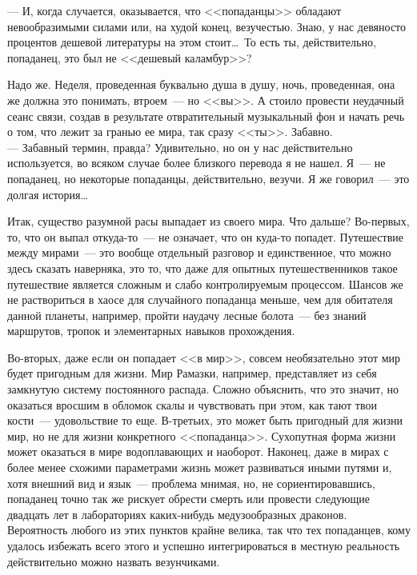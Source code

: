 \noindent --- И, когда случается, оказывается, что <<попаданцы>> обладают 
невообразимыми 
силами или, на худой конец, везучестью. Знаю, у нас девяносто процентов дешевой 
литературы на этом стоит\ldots\ То есть ты, действительно, попаданец, это был 
не 
<<дешевый каламбур>>?

Надо же. Неделя, проведенная буквально душа в душу, ночь, проведенная, она же 
должна это понимать, втроем~--- но <<вы>>. А стоило провести неудачный сеанс 
связи, 
создав в результате отвратительный музыкальный фон и начать речь о том, что 
лежит за гранью ее мира, так сразу <<ты>>. Забавно.\\
--- Забавный термин, правда? Удивительно, но он у нас действительно 
используется, 
во всяком случае более близкого перевода я не нашел. Я~--- не попаданец, но 
некоторые попаданцы, действительно, везучи. Я же говорил~--- это долгая 
история\ldots

Итак, существо разумной расы выпадает из своего мира. Что дальше? Во-первых, 
то, 
что он выпал откуда-то~--- не означает, что он куда-то попадет. Путешествие 
между 
мирами~--- это вообще отдельный разговор и единственное, что можно здесь 
сказать наверняка, это то, что даже для опытных путешественников такое 
путешествие 
является сложным и слабо контролируемым процессом. Шансов же не раствориться в 
хаосе для случайного попаданца меньше, чем для обитателя данной планеты, 
например, пройти наудачу лесные болота~--- без знаний маршрутов, тропок и 
элементарных навыков прохождения.

Во-вторых, даже если он попадает <<в мир>>, совсем необязательно этот мир будет 
пригодным для жизни. Мир Рамазки, например, представляет из себя замкнутую 
систему постоянного распада. Сложно объяснить, что это значит, но оказаться 
вросшим в обломок скалы и чувствовать при этом, как тают твои кости~--- 
удовольствие то еще. В-третьих, это может быть пригодный для жизни мир, но не 
для жизни конкретного <<попаданца>>. Сухопутная форма жизни может оказаться в 
мире 
водоплавающих и наоборот. Наконец, даже в мирах с более менее схожими 
параметрами жизнь может развиваться иными путями и, хотя внешний вид и язык~--- 
проблема мнимая, но, не сориентировавшись, попаданец точно так же рискует 
обрести смерть или провести следующие двадцать лет в лабораториях каких-нибудь 
медузообразных драконов. Вероятность любого из этих пунктов крайне велика, так 
что тех попаданцев, кому удалось избежать всего этого и успешно интегрироваться 
в местную реальность действительно можно назвать везунчиками.

